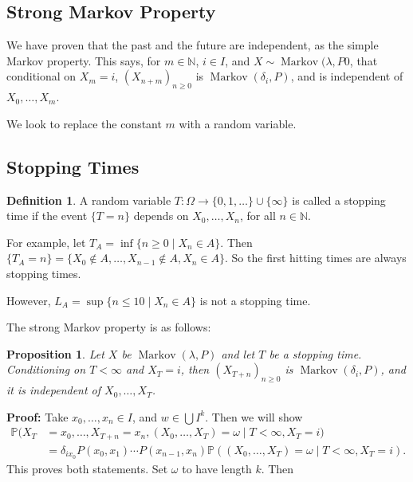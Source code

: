 \documentclass[12pt]{article}
\DeclareMathOperator{\Mkv}{Markov}
\newtheorem{proposition}{Proposition}[section]
\theoremstyle{definition}
\newtheorem{definition}{Definition}[section]
\theoremstyle{remark}
\begin{document}
\subsection{Strong Markov Property}%
\label{sub:strong_markov_property}

We have proven that the past and the future are independent, as the simple Markov property. This says, for $m \in \mathbb{N}$, $i \in I$, and $X \sim \Mkv(\lambda, P0$, that conditional on $X_m = i$, $(X_{n+m})_{n \geq 0}$ is $\Mkv(\delta_i, P)$, and is independent of $X_0, \ldots, X_m$.

We look to replace the constant $m$ with a random variable.

\subsection{Stopping Times}%
\label{sub:stopping_times}

\begin{definition}
	A random variable $T : \Omega \to \{0, 1, \ldots\} \cup \{\infty\}$ is called a stopping time if the event $\{T = n\}$ depends on $X_0, \ldots, X_n$, for all $n \in \mathbb{N}$.
\end{definition}

For example, let $T_A = \inf\{n \geq 0 \mid X_n \in A\}$. Then $\{T_A = n\} = \{X_0 \not \in A, \ldots, X_{n-1} \not \in A, X_n \in A\}$. So the first hitting times are always stopping times.

However, $L_A = \sup\{n \leq 10 \mid X_n \in A\}$ is not a stopping time.

The strong Markov property is as follows:
\begin{proposition}
	Let $X$ be $\Mkv(\lambda, P)$ and let $T$ be a stopping time. Conditioning on $T < \infty$ and $X_T = i$, then $(X_{T + n})_{n \geq 0}$ is $\Mkv(\delta_i, P)$, and it is independent of $X_0, \ldots, X_T$.
\end{proposition}

\begin{adjustbox}{minipage = \columnwidth - 25.5pt, margin=1em, frame=1pt, margin=0em}
\textbf{Proof:} Take $x_0, \ldots, x_n \in I$, and $w \in \bigcup I^{k}$. Then we will show
\begin{align*}
	\mathbb{P}(X_T &= x_0, \ldots, X_{T+n} = x_n, (X_0, \ldots, X_T) = \omega \mid T < \infty, X_T = i) \\
		       &= \delta_{ix_0}P(x_0, x_1)\cdots P(x_{n-1}, x_n) \mathbb{P}((X_0, \ldots, X_T) = \omega \mid T< \infty, X_T = i).
\end{align*}
This proves both statements. Set $\omega$ to have length $k$. Then
\end{adjustbox}
\end{document}
